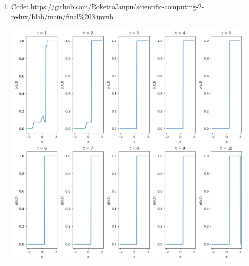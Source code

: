 \documentclass{article}
\begin{document}
\begin{enumerate}
\begin{enumerate}
	\item Code: \url{https://github.com/RokettoJanpu/scientific-computing-2-redux/blob/main/final%203.ipynb}
	\begin{center}
		\includegraphics[scale=.5]{final 3 sol}
	\end{center}
	
	
\end{enumerate}



\end{enumerate}
	
	
\end{document}
